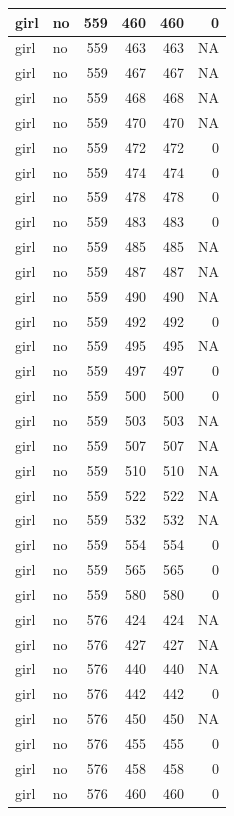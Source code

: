 \documentclass[man]{apa6}
\begin{document}
\begin{tabular}{l|l|r|r|r|r}
\hline
girl & no & 559 & 460 & 460 & 0\\
\hline
girl & no & 559 & 463 & 463 & NA\\
\hline
girl & no & 559 & 467 & 467 & NA\\
\hline
girl & no & 559 & 468 & 468 & NA\\
\hline
girl & no & 559 & 470 & 470 & NA\\
\hline
girl & no & 559 & 472 & 472 & 0\\
\hline
girl & no & 559 & 474 & 474 & 0\\
\hline
girl & no & 559 & 478 & 478 & 0\\
\hline
girl & no & 559 & 483 & 483 & 0\\
\hline
girl & no & 559 & 485 & 485 & NA\\
\hline
girl & no & 559 & 487 & 487 & NA\\
\hline
girl & no & 559 & 490 & 490 & NA\\
\hline
girl & no & 559 & 492 & 492 & 0\\
\hline
girl & no & 559 & 495 & 495 & NA\\
\hline
girl & no & 559 & 497 & 497 & 0\\
\hline
girl & no & 559 & 500 & 500 & 0\\
\hline
girl & no & 559 & 503 & 503 & NA\\
\hline
girl & no & 559 & 507 & 507 & NA\\
\hline
girl & no & 559 & 510 & 510 & NA\\
\hline
girl & no & 559 & 522 & 522 & NA\\
\hline
girl & no & 559 & 532 & 532 & NA\\
\hline
girl & no & 559 & 554 & 554 & 0\\
\hline
girl & no & 559 & 565 & 565 & 0\\
\hline
girl & no & 559 & 580 & 580 & 0\\
\hline
girl & no & 576 & 424 & 424 & NA\\
\hline
girl & no & 576 & 427 & 427 & NA\\
\hline
girl & no & 576 & 440 & 440 & NA\\
\hline
girl & no & 576 & 442 & 442 & 0\\
\hline
girl & no & 576 & 450 & 450 & NA\\
\hline
girl & no & 576 & 455 & 455 & 0\\
\hline
girl & no & 576 & 458 & 458 & 0\\
\hline
girl & no & 576 & 460 & 460 & 0\\

\end{tabular}
\end{document}
